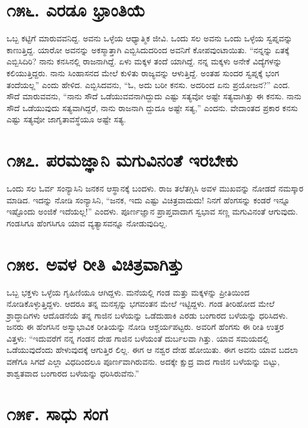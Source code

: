 \section{\num{೧೫೬. } ಎರಡೂ ಭ್ರಾಂತಿಯೆ}

ಒಬ್ಬ ಕಟ್ಟಿಗೆ ಮಾರುವವನಿದ್ದ. ಅವನು ಒಳ್ಳೆಯ ಆಧ್ಯಾತ್ಮಿಕ ಜೀವಿ. ಒಂದು ಸಲ ಅವನು ಒಂದು ಒಳ್ಳೆಯ ಸ್ವಪ್ನವನ್ನು ಕಾಣುತ್ತಿದ್ದ. ಯಾರೋ ಅವನನ್ನು ಅಕಸ್ಮಾತ್ತಾಗಿ ಎಬ್ಬಿಸಿದುದರಿಂದ ಅವನಿಗೆ ಕೋಪವುಂಟಾಯಿತು. “ನನ್ನನ್ನು ಏತಕ್ಕೆ ಎಬ್ಬಿಸಿದಿರಿ? ನಾನು ಕನಸಿನಲ್ಲಿ ರಾಜನಾಗಿದ್ದೆ. ಏಳು ಮಕ್ಕಳ ತಂದೆ ಯಾಗಿದ್ದೆ. ನನ್ನ ಮಕ್ಕಳು ಅನೇಕೆ ವಿದ್ಯೆಗಳನ್ನು ಕಲಿಯುತ್ತಿದ್ದರು. ನಾನು ಸಿಂಹಾಸನದ ಮೇಲೆ ಕುಳಿತು ರಾಜ್ಯವನ್ನು ಆಳುತ್ತಿದ್ದೆ. ಅಂತಹ ಸುಂದರ ಸ್ವಪ್ನಕ್ಕೆ ಭಂಗ ತಂದೆಯಲ್ಲ” ಎಂದು ಹೇಳಿದ. ಎಬ್ಬಿಸಿದವನು, “ಓ, ಅದು ಬರೀ ಕನಸು. ಅದರಿಂದ ಏನು ಪ್ರಯೋಜನ?” ಎಂದ. ಸೌದೆ ಮಾರುವವನು, “ನಾನು ಸೌದೆ ಒಡೆಯುವವನಾಗಿದ್ದುದು ಎಷ್ಟು ಸತ್ಯವೋ ಅಷ್ಟೇ ಸತ್ಯವಾಗಿತ್ತು ಈ ಕನಸು. ನಾನು ಸೌದೆ ಒಡೆಯುವುದು ಸತ್ಯವಾಗಿದ್ದರೆ, ನಾನು ರಾಜನಾಗಿ ದ್ದುದೂ ಅಷ್ಟೇ ಸತ್ಯ,” ಎಂದನು. ವೇದಾಂತದ ಪ್ರಕಾರ ಕನಸು ಎಷ್ಟು ಸತ್ಯವೋ ಜಾಗೃತಾವಸ್ಥೆಯೂ ಅಷ್ಟೇ ಸತ್ಯ.


\section{\num{೧೫೭. } ಪರಮಜ್ಞಾನಿ ಮಗುವಿನಂತೆ ಇರಬೇಕು}

ಒಂದು ಸಲ ಓರ್ವ ಸಂನ್ಯಾಸಿನಿ ಜನಕನ ಆಸ್ಥಾನಕ್ಕೆ ಬಂದಳು. ರಾಜ ತಲೆತಗ್ಗಿಸಿ ಅವಳ ಮುಖವನ್ನು ನೋಡದೆ ನಮಸ್ಕಾರ ಮಾಡಿದ. ಇದನ್ನು ನೋಡಿ ಸಂನ್ಯಾಸಿನಿ, “ಜನಕ, ಇದು ಎಷ್ಟು ವಿಚಿತ್ರವಾದುದು! ನಿನಗೆ ಹೆಂಗಸನ್ನು ಕಂಡರೆ ಇನ್ನೂ ಇಷ್ಟೊಂದು ಅಂಜಿಕೆ ಇದೆಯಲ್ಲ!” ಎಂದಳು. ಪೂರ್ಣಜ್ಞಾನ ಪ್ರಾಪ್ತವಾದಾಗ ಸ್ವಭಾವ ಸಣ್ಣ ಮಗುವಿನಂತೆ ಆಗುವುದು. ಗಂಡಸಿಗೂ ಹೆಂಗಸಿಗೂ ಯಾವ ವ್ಯತ್ಯಾಸವನ್ನೂ ನೋಡುವುದಿಲ್ಲ.


\section{\num{೧೫೮. } ಅವಳ ರೀತಿ ವಿಚಿತ್ರವಾಗಿತ್ತು}

ಒಬ್ಬ ಭಕ್ತಳು ಒಳ್ಳೆಯ ಗೃಹಿಣಿಯೂ ಆಗಿದ್ದಳು. ಮನೆಯಲ್ಲಿ ಗಂಡ ಮತ್ತು ಮಕ್ಕಳನ್ನು ಪ್ರೀತಿಯಿಂದ ನೋಡಿಕೊಳ್ಳುತ್ತಿದ್ದಳು. ಆದರೂ ತನ್ನ ಮನಸ್ಸನ್ನು ಭಗವಂತನ ಮೇಲೆ ಇಟ್ಟಿದ್ದಳು. ಗಂಡ ತೀರಿಹೋದ ಮೇಲೆ ಶ್ರಾದ್ಧಾದಿಗಳು ಆದೊಡನೆಯೆ ತನ್ನ ಗಾಜಿನ ಬಳೆಯನ್ನು ಒಡೆದುಹಾಕಿ ಎರಡು ಬಂಗಾರದ ಬಳೆಯನ್ನು ಧರಿಸಿದಳು. ಜನರು ಈ ಹೆಂಗಸಿನ ಅಸ್ವಾಭಾವಿಕ ರೀತಿಯನ್ನು ನೋಡಿ ಆಶ್ಚರ್ಯಪಟ್ಟರು. ಅವರಿಗೆ ಹೆಂಗಸು ಈ ರೀತಿ ಉತ್ತರ ವಿತ್ತಳು: “ಇದುವರೆಗೆ ನನ್ನ ಗಂಡನ ದೇಹ ಗಾಜಿನ ಬಳೆಯಂತೆ ದುರ್ಬಲವಾ ಗಿತ್ತು. ಯಾವ ಸಮಯದಲ್ಲಿ ಒಡೆಯುವುದೆಂದು ಹೇಳುವುದಕ್ಕೆ ಆಗುತ್ತಿರ ಲಿಲ್ಲ. ಈಗ ಆ ನಶ್ವರ ದೇಹ ಹೋಯಿತು. ಈಗ ಅವನು ಯಾವ ಬದಲಾ ವಣೆಗೂ ಸಿಗದೆ ಎಲ್ಲಾ ವಿಧದಿಂದಲೂ ಪೂರ್ಣವಾಗಿರುವನು. ಅದಕ್ಕೇ ಕ್ಷುದ್ರ ವಾದ ಗಾಜಿನ ಬಳೆಯನ್ನು ಬಿಟ್ಟು, ಶಾಶ್ವತವಾದ ಬಂಗಾರದ ಬಳೆಯನ್ನು ಧರಿಸಿರುವೆನು.”


\section{\num{೧೫೯. } ಸಾಧು ಸಂಗ}

